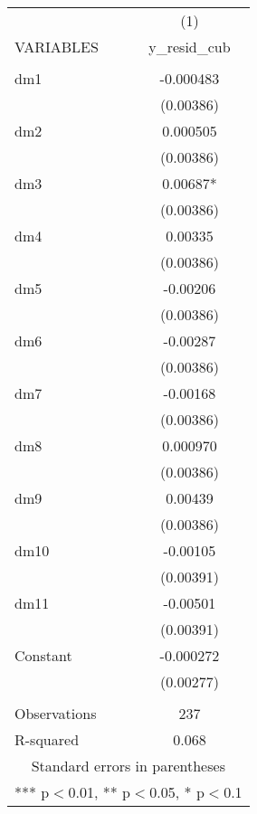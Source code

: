 \documentclass[]{article}
\begin{document}
\begin{tabular}{lc} \hline
 & (1) \\
VARIABLES & y\_resid\_cub \\ \hline
 &  \\
dm1 & -0.000483 \\
 & (0.00386) \\
dm2 & 0.000505 \\
 & (0.00386) \\
dm3 & 0.00687* \\
 & (0.00386) \\
dm4 & 0.00335 \\
 & (0.00386) \\
dm5 & -0.00206 \\
 & (0.00386) \\
dm6 & -0.00287 \\
 & (0.00386) \\
dm7 & -0.00168 \\
 & (0.00386) \\
dm8 & 0.000970 \\
 & (0.00386) \\
dm9 & 0.00439 \\
 & (0.00386) \\
dm10 & -0.00105 \\
 & (0.00391) \\
dm11 & -0.00501 \\
 & (0.00391) \\
Constant & -0.000272 \\
 & (0.00277) \\
 &  \\
Observations & 237 \\
 R-squared & 0.068 \\ \hline
\multicolumn{2}{c}{ Standard errors in parentheses} \\
\multicolumn{2}{c}{ *** p$<$0.01, ** p$<$0.05, * p$<$0.1} \\
\end{tabular}
\end{document}
